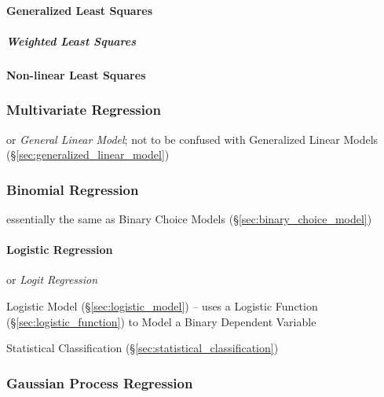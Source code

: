 \paragraph{Generalized Least Squares}\label{sec:generalized_least_squares}\hfill

\subparagraph{Weighted Least Squares}\label{sec:weighted_least_squares}\hfill



\paragraph{Non-linear Least Squares}\label{sec:nonlinear_least_squares}\hfill



\subsubsection{Multivariate Regression}\label{sec:multivariate_regression}

or \emph{General Linear Model}; not to be confused with Generalized Linear
Models (\S\ref{sec:generalized_linear_model})



\subsubsection{Binomial Regression}\label{sec:binomial_regression}

essentially the same as Binary Choice Models (\S\ref{sec:binary_choice_model})



\paragraph{Logistic Regression}\label{sec:logistic_regression}\hfill

or \emph{Logit Regression}

Logistic Model (\S\ref{sec:logistic_model}) -- uses a Logistic Function
(\S\ref{sec:logistic_function}) to Model a Binary Dependent Variable

Statistical Classification (\S\ref{sec:statistical_classification})



\subsubsection{Gaussian Process Regression}
\label{sec:gaussian_process_regression}

